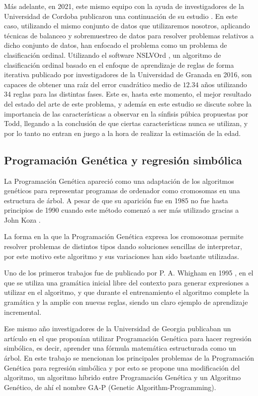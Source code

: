 Más adelante, en 2021, este mismo equipo con la ayuda de investigadores de la Universidad de Cordoba publicaron una continuación de su estudio \cite{NSLVOrdAge}. En este caso, utilizando el mismo conjunto de datos que utilizaremos nosotros, aplicando técnicas de balanceo y sobremuestreo de datos para resolver problemas relativos a dicho conjunto de datos, han enfocado el problema como un problema de clasificación ordinal. Utilizando el software NSLVOrd \cite{NSLVOrd}, un algoritmo de clasificación ordinal basado en el enfoque de aprendizaje de reglas de forma iterativa publicado por investigadores de la Universidad de Granada en 2016, son capaces de obtener una raíz del error cuadrático medio de $12.34$ años utilizando 34 reglas para las distintas fases. Este es, hasta este momento, el mejor resultado del estado del arte de este problema, y además en este estudio se discute sobre la importancia de las características a observar en la sínfisis púbica propuestas por Todd, llegando a la conclusión de que ciertas características nunca se utilizan, y por lo tanto no entran en juego a la hora de realizar la estimación de la edad.

\subsection{Programación Genética y regresión simbólica}

La Programación Genética apareció como una adaptación de los algoritmos genéticos para representar programas de ordenador como cromosomas en una estructura de árbol. A pesar de que su aparición fue en 1985 no fue hasta principios de 1990 cuando este método comenzó a ser más utilizado gracias a John Koza \cite{kozaGP}.

La forma en la que la Programación Genética expresa los cromosomas permite resolver problemas de distintos tipos dando soluciones sencillas de interpretar, por este motivo este algoritmo y sus variaciones han sido bastante utilizadas.

Uno de los primeros trabajos fue de publicado por P. A. Whigham en 1995 \cite{PGgramaticas}, en el que se utiliza una gramática inicial libre del contexto para generar expresiones a utilizar en el algoritmo, y que durante el entrenamiento el algoritmo complete la gramática y la amplíe con nuevas reglas, siendo un claro ejemplo de aprendizaje incremental.

Ese mismo año investigadores de la Universidad de Georgia publicaban un artículo \cite{primerGAP} en el que proponían utilizar Programación Genética para hacer regresión simbólica, es decir, aprender una fórmula matemática estructurada como un árbol. En este trabajo se mencionan los principales problemas de la Programación Genética para regresión simbólica y por esto se propone una modificación del algoritmo, un algoritmo híbrido entre Programación Genética y un Algoritmo Genético, de ahí el nombre GA-P (Genetic Algorithm-Programming).


